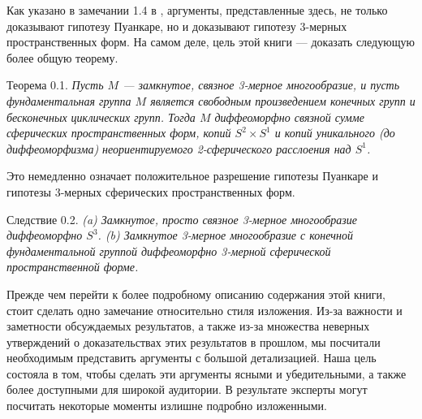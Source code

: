 Как указано в замечании 1.4 в \cite{c54}, аргументы, представленные здесь, не только 
доказывают гипотезу Пуанкаре, но и доказывают гипотезу 3-мерных пространственных 
форм. На самом деле, цель этой книги — доказать следующую более общую теорему.\vspace{0.5em}

Теорема 0.1. \textit{Пусть $M$ — замкнутое, связное 3-мерное многообразие, 
и пусть фундаментальная группа $M$ является свободным произведением конечных 
групп и бесконечных циклических групп. Тогда $M$ диффеоморфно связной сумме 
сферических пространственных форм, копий $S^{2}\times S^{1}$ и копий 
уникального (до диффеоморфизма) неориентируемого 2-сферического расслоения над 
$S^{1}$.}\vspace{0.5em}

Это немедленно означает положительное разрешение гипотезы Пуанкаре и гипотезы 
3-мерных сферических пространственных форм.\vspace{0.5em}

Следствие 0.2.\textit{
(a) Замкнутое, просто связное 3-мерное многообразие диффеоморфно $S^{3}$.
(b) Замкнутое 3-мерное многообразие с конечной фундаментальной группой диффеоморфно 
3-мерной сферической пространственной форме.}\vspace{0.5em}

Прежде чем перейти к более подробному описанию содержания этой книги, стоит 
сделать одно замечание относительно стиля изложения. Из-за важности и 
заметности обсуждаемых результатов, а также из-за множества неверных утверждений 
о доказательствах этих результатов в прошлом, мы посчитали необходимым 
представить аргументы с большой детализацией. Наша цель состояла в том, чтобы 
сделать эти аргументы ясными и убедительными, а также более доступными для 
широкой аудитории. В результате эксперты могут посчитать некоторые моменты 
излишне подробно изложенными.











